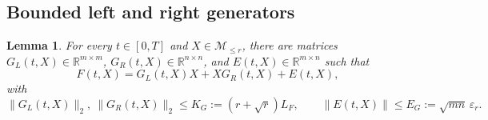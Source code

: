 \documentclass[]{article}
\numberwithin{equation}{section}
\theoremstyle{plain}
\newtheorem{lemma}[theorem]{Lemma}
\theoremstyle{remark}
\numberwithin{algorithm}{section}
\newcommand{\R}{\mathbb{R}}
\newcommand{\Mle}{\mathcal{M}_{\le r}}
\newcommand{\eps}{\varepsilon}
\begin{document}
\subsection{Bounded left and right generators}
\label{app:bounded-generators}

\begin{lemma}
\label{lem:bounded-generators}
For every \(t\in[0,T]\) and \(X\in\Mle\), there are matrices
\(G_L(t,X)\in\R^{m\times m}\), \(G_R(t,X)\in\R^{n\times n}\), and
\(E(t,X)\in\R^{m\times n}\) such that
\begin{equation}\label{eq:generator-decomposition}
 F(t,X)=G_L(t,X)X+XG_R(t,X)+E(t,X),
\end{equation}
with
\begin{equation}\label{eq:generator-bounds}
 \|G_L(t,X)\|_2,\ \|G_R(t,X)\|_2
 \le K_G:=(r+\sqrt r)L_F,
 \qquad
 \|E(t,X)\|\le E_G:=\sqrt{mn}\,\eps_r.
\end{equation}
\end{lemma}
\end{document}

